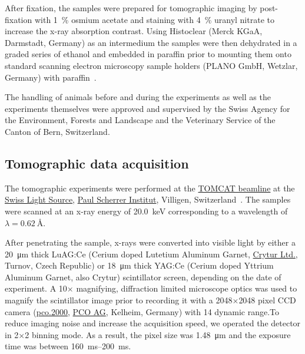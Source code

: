 \documentclass[twoside,paper=a4,abstract=true,english,DIV=calc]{scrartcl}
\begin{document}
After fixation, the samples were prepared for tomographic imaging by post-fixation with \SI{1}{\percent} osmium acetate and staining with \SI{4}{\percent} uranyl nitrate to increase the x-ray absorption contrast.
Using Histoclear (Merck KGaA, Darmstadt, Germany) as an intermedium the samples were then dehydrated in a graded series of ethanol and embedded in paraffin prior to mounting them onto standard scanning electron microscopy sample holders (PLANO GmbH, Wetzlar, Germany) with paraffin~\cite{Tsuda2008}.

The handling of animals before and during the experiments as well as the experiments themselves were approved and supervised by the Swiss Agency for the Environment, Forests and Landscape and the Veterinary Service of the Canton of Bern, Switzerland.

\subsection{Tomographic data acquisition}
The tomographic experiments were performed at the \href{http://www.psi.ch/sls/tomcat/}{TOMCAT beamline} at the \href{http://www.psi.ch/sls/}{Swiss Light Source}, \href{http://www.psi.ch/}{Paul Scherrer Institut}, Villigen, Switzerland~\cite{Stampanoni2006a}.
The samples were scanned at an x-ray energy of \SI{20.0}{\kilo\electronvolt} corresponding to a wavelength of \(\lambda=\SI{0.62}{\angstrom}\).%

After penetrating the sample, x-rays were converted into visible light by either a \SI{20}{\micro\meter} thick LuAG:Ce (Cerium doped Lutetium Aluminum Garnet, \href{http://www.crytur.cz/}{Crytur Ltd.}, Turnov, Czech Republic) or \SI{18}{\micro\meter} thick YAG:Ce (Cerium doped Yttrium Aluminum Garnet, also Crytur) scintillator screen, depending on the date of experiment.
A 10\(\times\) magnifying, diffraction limited microscope optics was used to magnify the scintillator image prior to recording it with a 2048\(\times\)2048 pixel CCD camera (\href{http://www.pco.de/sensitive-cameras/pco2000/}{pco.2000}, \href{http://www.pco.de/}{PCO AG}, Kelheim, Germany) with \SI{14}{\bit} dynamic range.To reduce imaging noise and increase the acquisition speed, we operated the detector in 2\(\times\)2 binning mode.
As a result, the pixel size was \SI{1.48}{\micro\meter} and the exposure time was between \SIrange{160}{200}{\milli\second}.
\end{document}
